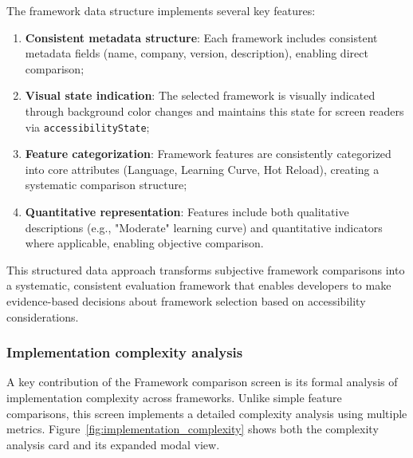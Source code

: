 The framework data structure implements several key features:

\begin{enumerate}
    \item \textbf{Consistent metadata structure}: Each framework includes consistent metadata fields (name, company, version, description), enabling direct comparison;
    
    \item \textbf{Visual state indication}: The selected framework is visually indicated through background color changes and maintains this state for screen readers via \texttt{accessibilityState};
    
    \item \textbf{Feature categorization}: Framework features are consistently categorized into core attributes (Language, Learning Curve, Hot Reload), creating a systematic comparison structure;
    
    \item \textbf{Quantitative representation}: Features include both qualitative descriptions (e.g., "Moderate" learning curve) and quantitative indicators where applicable, enabling objective comparison.
\end{enumerate}

This structured data approach transforms subjective framework comparisons into a systematic, consistent evaluation framework that enables developers to make evidence-based decisions about framework selection based on accessibility considerations.

\subsubsection{Implementation complexity analysis}

A key contribution of the Framework comparison screen is its formal analysis of implementation complexity across frameworks. Unlike simple feature comparisons, this screen implements a detailed complexity analysis using multiple metrics. Figure~\ref{fig:implementation_complexity} shows both the complexity analysis card and its expanded modal view.

